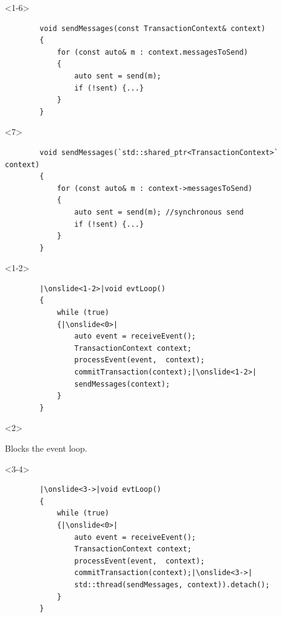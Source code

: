 \documentclass{beamer}
\begin{document}
\begin{frame}[fragile,t]
	\begin{onlyenv}<1-6>
	\begin{lstlisting}
		void sendMessages(const TransactionContext& context)
		{
			for (const auto& m : context.messagesToSend)
			{
				auto sent = send(m);
				if (!sent) {...}
			}
		}
	\end{lstlisting}
	\end{onlyenv}
	
	\begin{onlyenv}
	\begin{lstlisting}
		void sendMessages(`std::shared_ptr<TransactionContext>` context)
		{
			for (const auto& m : context->messagesToSend)
			{
				auto sent = send(m); //synchronous send
				if (!sent) {...}
			}
		}
	\end{lstlisting}
	\end{onlyenv}

	
	\begin{onlyenv}<1-2>
	\begin{lstlisting}
		|\onslide<1-2>|void evtLoop()
		{
			while (true)
			{|\onslide<0>| 
				auto event = receiveEvent();
				TransactionContext context;
				processEvent(event,  context);
				commitTransaction(context);|\onslide<1-2>|
				sendMessages(context);
			}
		}
	\end{lstlisting}
	\end{onlyenv}
    
    \begin{onlyenv}<2>
    \begin{alertblock}{}
        Blocks the event loop.
    \end{alertblock}
	\end{onlyenv}
	
	\begin{onlyenv}<3-4>
	\begin{lstlisting}
        |\onslide<3->|void evtLoop()
        {
	        while (true)
            {|\onslide<0>| 
                auto event = receiveEvent();
                TransactionContext context;
                processEvent(event,  context);
                commitTransaction(context);|\onslide<3->|
                std::thread(sendMessages, context)).detach();
            }
        }
	\end{lstlisting}
	\end{onlyenv}


\end{frame}
\end{document}
